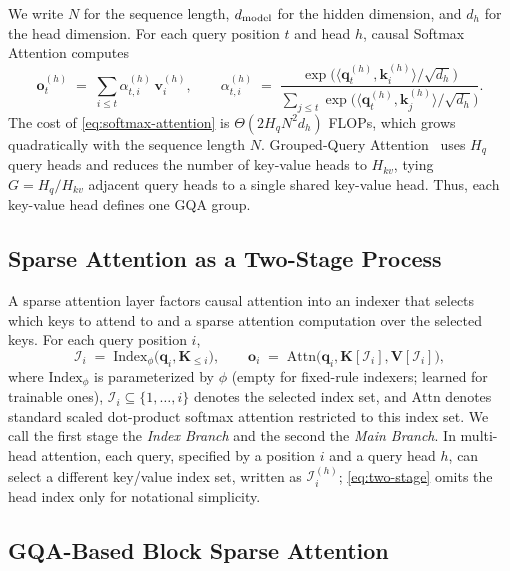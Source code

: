 \documentclass{llmxive}
\providecommand{\bm}[1]{\boldsymbol{#1}}
\providecommand{\vk}{{\bm{k}}}
\providecommand{\vo}{{\bm{o}}}
\providecommand{\vq}{{\bm{q}}}
\providecommand{\vv}{{\bm{v}}}
\providecommand{\mK}{{\bm{K}}}
\providecommand{\mV}{{\bm{V}}}
\providecommand{\gI}{{\mathcal{I}}}
\begin{document}
We write $N$ for the sequence length, $d_{\rm model}$ for the hidden dimension, and $d_h$ for the head dimension. For each query position $t$ and head $h$, causal Softmax Attention computes
\begin{equation}
\label{eq:softmax-attention}
    \vo_t^{(h)} \;=\; \sum_{i \le t} \alpha_{t,i}^{(h)} \, \vv_i^{(h)},
    \qquad
    \alpha_{t,i}^{(h)} \;=\; \frac{\exp\!\big(\langle \vq_t^{(h)}, \vk_i^{(h)} \rangle / \sqrt{d_h}\big)}{\sum_{j \le t} \exp\!\big(\langle \vq_t^{(h)}, \vk_j^{(h)} \rangle / \sqrt{d_h}\big)}.
\end{equation}
The cost of \cref{eq:softmax-attention} is $\Theta(2H_q N^2 d_h)$ FLOPs, which grows quadratically with the sequence length $N$. Grouped-Query Attention~\citep{ainslie2023gqa} uses $H_q$ query heads and reduces the number of key-value heads to $H_{kv}$, tying $G=H_q/H_{kv}$ adjacent query heads to a single shared key-value head. Thus, each key-value head defines one GQA group. 


\subsection{Sparse Attention as a Two-Stage Process}
\label{sec:preliminary-sparse}

A sparse attention layer factors causal attention into an indexer that selects which keys to attend to and a sparse attention computation over the selected keys. For each query position $i$,
\begin{equation}
\label{eq:two-stage}
    \gI_i \;=\; \mathrm{Index}_\phi\!\big(\vq_i, \mK_{\le i}\big),
    \qquad
    \vo_i \;=\; \mathrm{Attn}\!\big(\vq_i, \mK[\gI_i], \mV[\gI_i]\big),
\end{equation}
where $\mathrm{Index}_\phi$ is parameterized by $\phi$ (empty for fixed-rule indexers; learned for trainable ones), $\gI_i \subseteq \{1, \dots, i\}$ denotes the selected index set, and $\mathrm{Attn}$ denotes standard scaled dot-product softmax attention restricted to this index set. We call the first stage the \emph{Index Branch} and the second the \emph{Main Branch}. In multi-head attention, each query, specified by a position $i$ and a query head $h$, can select a different key/value index set, written as $\gI_i^{(h)}$; \cref{eq:two-stage} omits the head index only for notational simplicity.

\subsection{GQA-Based Block Sparse Attention}
\label{sec:preliminary-gqa-block-sparse}
\end{document}
